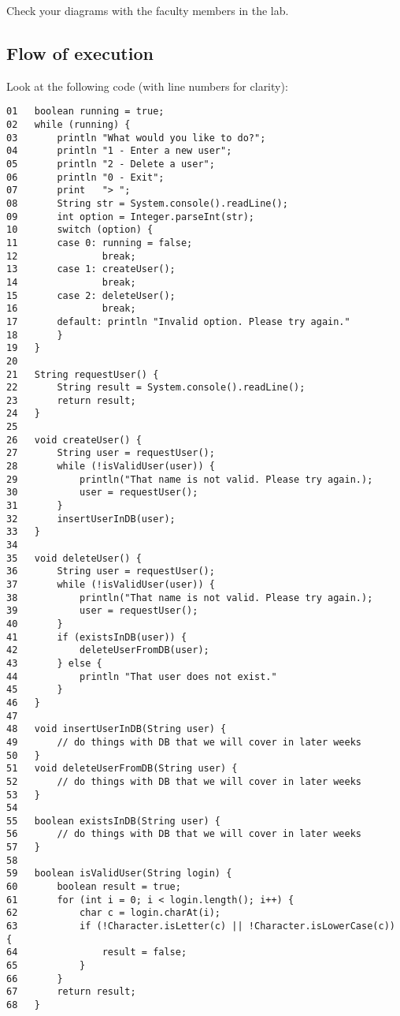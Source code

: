 \documentclass{article}
\begin{document}
Check your diagrams with the faculty members in the lab. 

\subsection{Flow of execution}
\label{sec:flow-execution}

Look at the following code (with line numbers for clarity): 

\begin{verbatim}
01   boolean running = true;
02   while (running) { 
03       println "What would you like to do?";
04       println "1 - Enter a new user";
05       println "2 - Delete a user";
06       println "0 - Exit";
07       print   "> ";
08       String str = System.console().readLine();
09       int option = Integer.parseInt(str);
10       switch (option) {
11       case 0: running = false;
12               break;
13       case 1: createUser();
14               break;
15       case 2: deleteUser();
16               break;
17       default: println "Invalid option. Please try again."
18       }
19   }
20
21   String requestUser() {
22       String result = System.console().readLine();
23       return result;
24   }
25   
26   void createUser() {
27       String user = requestUser();
28       while (!isValidUser(user)) {
29           println("That name is not valid. Please try again.);
30           user = requestUser();
31       }
32       insertUserInDB(user);
33   }
34   
35   void deleteUser() {
36       String user = requestUser();
37       while (!isValidUser(user)) {
38           println("That name is not valid. Please try again.);
39           user = requestUser();
40       }
41       if (existsInDB(user)) {
42           deleteUserFromDB(user);
43       } else {
44           println "That user does not exist."
45       }
46   }
47   
48   void insertUserInDB(String user) {
49       // do things with DB that we will cover in later weeks
50   }  
51   void deleteUserFromDB(String user) {
52       // do things with DB that we will cover in later weeks
53   }
54   
55   boolean existsInDB(String user) {
56       // do things with DB that we will cover in later weeks
57   }
58   
59   boolean isValidUser(String login) {
60       boolean result = true;
61       for (int i = 0; i < login.length(); i++) {
62           char c = login.charAt(i);
63           if (!Character.isLetter(c) || !Character.isLowerCase(c)) {
64               result = false;
65           }
66       }
67       return result;
68   }
\end{verbatim}
\end{document}
